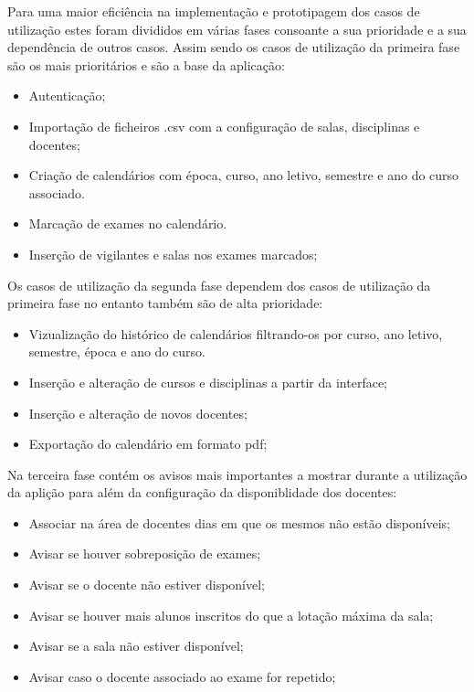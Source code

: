 \documentclass[11pt, twoside]{report}
\begin{document}
	Para uma maior eficiência na implementação e prototipagem dos casos de utilização estes foram divididos em várias fases consoante a sua prioridade e a sua dependência de outros casos. Assim sendo os casos de utilização da primeira fase são os mais prioritários e são a base da aplicação:
	
	\begin{itemize}
		\item Autenticação;
		\item Importação de ficheiros .csv com a configuração de salas, disciplinas e docentes;
		\item Criação de calendários com época, curso, ano letivo, semestre e ano do curso associado.
		\item Marcação de exames no calendário.
		\item Inserção de vigilantes e salas nos exames marcados;
	\end{itemize}
	
	Os casos de utilização da segunda fase dependem dos casos de utilização da primeira fase no entanto também são de alta prioridade: 
	
	\begin{itemize}
		\item Vizualização do histórico de calendários filtrando-os por curso, ano letivo, semestre, época e ano do curso.
		\item Inserção e alteração de cursos e disciplinas a partir da interface;
		\item Inserção e alteração de novos docentes;
		\item Exportação do calendário em formato pdf;
	\end{itemize}
	
	
	Na terceira fase contém os avisos mais importantes a mostrar durante a utilização da aplição para além da configuração da disponiblidade dos docentes:
	
	\begin{itemize}
		\item Associar na área de docentes dias em que os mesmos não estão disponíveis;
		\item Avisar se houver sobreposição de exames;
		\item Avisar se o docente não estiver disponível;
		\item Avisar se houver mais alunos inscritos do que a lotação máxima da sala;
		\item Avisar se a sala não estiver disponível;
		\item Avisar caso o docente associado ao exame for repetido;
	\end{itemize}
	
\end{document}
